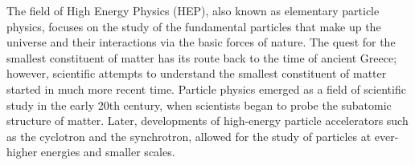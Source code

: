 
%
The field of High Energy Physics (HEP), also known as elementary particle physics,
focuses on the study of the fundamental particles that make up the universe and their interactions via the basic forces of nature.
%
The quest for the smallest constituent of matter has its route back to the time of ancient Greece;
however, scientific attempts to understand the smallest constituent of matter started in much more recent time.
%
Particle physics emerged as a field of scientific study in the early 20th century,
when scientists began to probe the subatomic structure of matter.
%
Later, developments
of high-energy particle accelerators such as the cyclotron and the synchrotron, allowed
for the study of particles at ever-higher energies and smaller scales.
%


%









